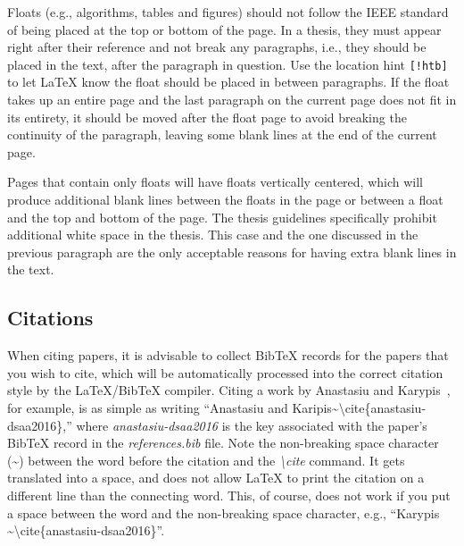 Floats (e.g., algorithms, tables and figures) should not follow the IEEE standard of being placed at the top or bottom of the page. In a thesis, they must appear right after their reference and not break any paragraphs, i.e., they should be placed in the text, after the paragraph in question. Use the location hint \texttt{[!htb]} to let LaTeX know the float should be placed in between paragraphs. If the float takes up an entire page and the last paragraph on the current page does not fit in its entirety, it should be moved after the float page to avoid breaking the continuity of the paragraph, leaving some blank lines at the end of the current page.

Pages that contain only floats will have floats vertically centered, which will produce additional blank lines between the floats in the page or between a float and the top and bottom of the page. The thesis guidelines specifically prohibit additional white space in the thesis. This case and the one discussed in the previous paragraph are the only acceptable reasons for having extra blank lines in the text.

\subsection{Citations}\label{sec:latex:citations}
When citing papers, it is advisable to collect BibTeX records for the papers that you wish to cite, which will be automatically processed into the correct citation style by the LaTeX/BibTeX compiler. Citing a work by Anastasiu and Karypis~\cite{anastasiu-dsaa2016}, for example, is as simple as writing ``Anastasiu and Karipis\textasciitilde{\textbackslash}cite\{anastasiu-dsaa2016\},'' where \textit{anastasiu-dsaa2016} is the key associated with the paper's BibTeX record in the \textit{references.bib} file. Note the non-breaking space character (\textasciitilde) between the word before the citation and the \textit{{\textbackslash}cite} command. It gets translated into a space, and does not allow LaTeX to print the citation on a different line than the connecting word. This, of course, does not work if you put a space between the word and the non-breaking space character, e.g., ``Karypis \textasciitilde{\textbackslash}cite\{anastasiu-dsaa2016\}''.

